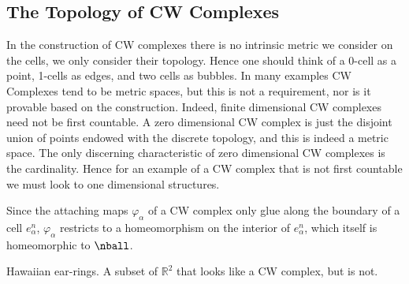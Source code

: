 \documentclass{book}                                                           %
\begin{document}
            \subsection{The Topology of CW Complexes}
                In the construction of CW complexes there is no intrinsic metric
                we consider on the cells, we only consider their topology. Hence
                one should think of a 0-cell as a point, 1-cells as edges, and
                two cells as bubbles. In many examples CW Complexes tend to be
                metric spaces, but this is not a requirement, nor is it provable
                based on the construction. Indeed, finite dimensional CW
                complexes need not be first countable. A zero dimensional CW
                complex is just the disjoint union of points endowed with the
                discrete topology, and this is indeed a metric space. The only
                discerning characteristic of zero dimensional CW complexes is
                the cardinality. Hence for an example of a CW complex that is
                not first countable we must look to one dimensional structures.
                \par\hfill\par
                Since the attaching maps $\varphi_{\alpha}$ of a CW complex only
                glue along the boundary of a cell $e_{\alpha}^{n}$,
                $\varphi_{\alpha}$ restricts to a homeomorphism on the interior
                of $e_{\alpha}^{n}$, which itself is homeomorphic to $\nball$.
                \begin{example}
                    Hawaiian ear-rings. A subset of $\mathbb{R}^{2}$ that looks
                    like a CW complex, but is not.
                \end{example}
\end{document}
